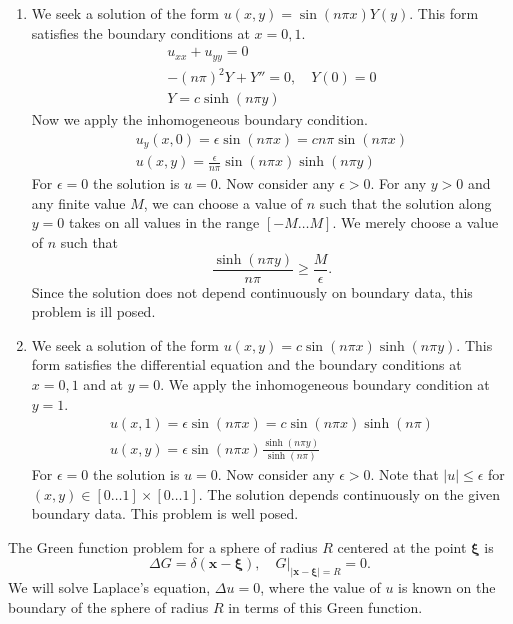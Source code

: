 {\begin{Solution}
\begin{enumerate}
\item 
  We seek a solution of the form $u(x,y) = \sin(n \pi x) Y(y)$.  This form 
  satisfies the boundary conditions at $x = 0,1$.
  \begin{gather*}
    u_{x x} + u_{y y} = 0
    \\
    -(n \pi)^2 Y + Y'' = 0, \quad Y(0) = 0
    \\
    Y = c \sinh(n \pi y)
  \end{gather*}
  Now we apply the inhomogeneous boundary condition.
  \begin{gather*}
    u_y(x,0) = \epsilon \sin(n \pi x) = c n \pi \sin(n \pi x)
    \\
    u(x,y) = \frac{\epsilon}{n \pi} \sin(n \pi x) \sinh(n \pi y)
  \end{gather*}
  For $\epsilon = 0$ the solution is $u = 0$.  Now consider any $\epsilon > 0$.  For any
  $y > 0$ and any finite value $M$, we can choose a value of $n$ such that 
  the solution along $y = 0$ takes on all values in the range $[-M \ldots M]$.
  We merely choose a value of $n$ such that
  \[
  \frac{\sinh(n \pi y)}{n \pi} \geq \frac{M}{\epsilon}.
  \]
  Since the solution does not depend continuously on boundary data, this 
  problem is ill posed.
\item 
  We seek a solution of the form $u(x,y) = c \sin(n \pi x) \sinh(n \pi y)$.  
  This form satisfies the differential equation and the boundary conditions 
  at $x = 0,1$ and at $y = 0$.
  We apply the inhomogeneous boundary condition at $y = 1$.
  \begin{gather*}
    u(x,1) = \epsilon \sin(n \pi x) = c \sin(n \pi x) \sinh(n \pi)
    \\
    u(x,y) = \epsilon \sin(n \pi x) \frac{\sinh(n \pi y)}{\sinh(n \pi)}
  \end{gather*}
  For $\epsilon = 0$ the solution is $u = 0$.  Now consider any $\epsilon > 0$.  Note that
  $|u| \leq \epsilon$ for $(x,y) \in [0 \ldots 1] \times [0 \ldots 1]$.  The solution depends 
  continuously on the given boundary data.  This problem is well posed.
\end{enumerate}
\end{Solution}








\begin{Solution}
The Green function problem for a sphere of radius $R$ centered at the point
$\boldsymbol{\xi}$ is
\begin{equation}
  \label{eqn DG=d, G=0}
  \Delta G = \delta(\mathbf{x} - \boldsymbol{\xi}), \quad
  G \big|_{|\mathbf{x} - \boldsymbol{\xi}| = R} = 0.
\end{equation}
We will solve Laplace's equation, $\Delta u = 0$, where the value of $u$ is
known on the boundary of the sphere of radius $R$ in terms of this 
Green function.


\end{Solution}}
